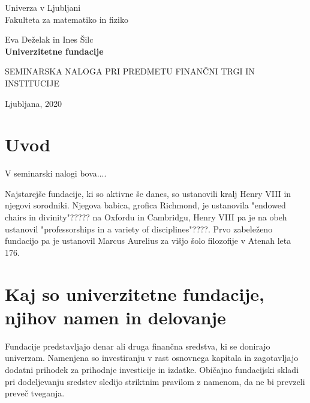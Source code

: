 \documentclass[12pt, a4paper]{article}
\begin{document}
\begin{titlepage}
\begin{center}

\large
Univerza v Ljubljani\\
\normalsize
Fakulteta za matematiko in fiziko\\

\vspace{3 cm} 

\large
Eva Deželak in Ines Šilc\\

\vspace{0.5cm}
\LARGE
\textbf{Univerzitetne fundacije}

\vspace{0.5 cm}
\normalsize


\vspace{1.5cm}
\normalsize
SEMINARSKA NALOGA PRI PREDMETU FINANČNI TRGI IN INSTITUCIJE

\vspace{3cm}


\vfill

\large Ljubljana, 2020

\end{center}
\end{titlepage}

\newpage

\tableofcontents

\listoffigures

\newpage

\section{Uvod}

V seminarski nalogi bova....

Najstarejše fundacije, ki so aktivne še danes, so ustanovili kralj Henry VIII in njegovi sorodniki. Njegova babica, grofica Richmond, je ustanovila "endowed chairs in divinity"????? na Oxfordu in Cambridgu, Henry VIII pa je na obeh ustanovil "professorships in a variety of disciplines"????. Prvo zabeleženo fundacijo pa je ustanovil Marcus Aurelius za višjo šolo filozofije v Atenah leta 176. \cite{Investopedia}

\section{Kaj so univerzitetne fundacije, njihov namen in delovanje}


Fundacije predstavljajo denar ali druga finančna sredstva, ki se donirajo univerzam. Namenjena so investiranju v rast osnovnega kapitala in zagotavljajo dodatni prihodek za prihodnje investicije in izdatke. Običajno fundacijski skladi pri dodeljevanju sredstev sledijo striktnim pravilom z namenom, da ne bi prevzeli preveč tveganja. 
\end{document}
